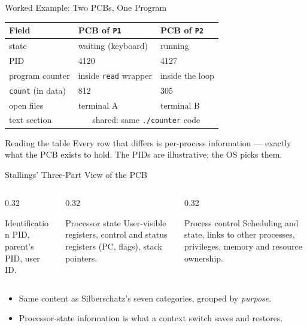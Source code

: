 \documentclass[aspectratio=169]{beamer}
\begin{document}
\begin{frame}{Worked Example: Two PCBs, One Program}
  \centering
  \footnotesize
  \renewcommand{\arraystretch}{1.25}
  \begin{tabular}{p{}p{}p{}}
    \textbf{Field} & \textbf{PCB of \texttt{P1}} & \textbf{PCB of \texttt{P2}} \\
    \hline
    state & waiting (keyboard) & running \\
    PID & 4120 & 4127 \\
    program counter & inside \texttt{read} wrapper & inside the loop \\
    \texttt{count} (in data) & 812 & 305 \\
    open files & terminal A & terminal B \\
    text section & \multicolumn{2}{c}{shared: same \texttt{./counter} code} \\
  \end{tabular}
  \vspace{0.3cm}
  \begin{exampleblock}{Reading the table}
    Every row that differs is per-process information --- exactly what the PCB
    exists to hold. The PIDs are illustrative; the OS picks them.
  \end{exampleblock}
\end{frame}

\begin{frame}{Stallings' Three-Part View of the PCB}
  \begin{columns}[T]
    \begin{column}{0.32\textwidth}
      \begin{block}{Identification}
        PID, parent's PID, user ID.
      \end{block}
    \end{column}
    \begin{column}{0.32\textwidth}
      \begin{block}{Processor state}
        User-visible registers, control and status registers (PC, flags),
        stack pointers.
      \end{block}
    \end{column}
    \begin{column}{0.32\textwidth}
      \begin{block}{Process control}
        Scheduling and state, links to other processes, privileges, memory and
        resource ownership.
      \end{block}
    \end{column}
  \end{columns}
  \vspace{0.25cm}
  \begin{itemize}
    \item Same content as Silberschatz's seven categories, grouped by
      \emph{purpose}.
    \item Processor-state information is what a context switch saves and
      restores.
  \end{itemize}
\end{frame}
\end{document}

